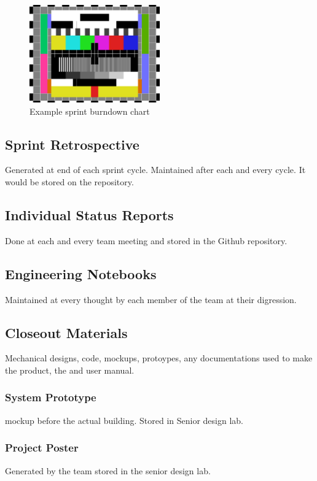 \begin{figure}[h!]
    \centering
    \includegraphics[width=0.5\textwidth]{images/test_image}
    \caption{Example sprint burndown chart}
\end{figure}

\subsection{Sprint Retrospective}
Generated at end of each sprint cycle. Maintained after each and every cycle. It would be stored on the repository.

\subsection{Individual Status Reports}
Done at each and every team meeting and stored in the Github repository.

\subsection{Engineering Notebooks}
Maintained at every thought by each member of the team at their digression.

\subsection{Closeout Materials}
Mechanical designs, code, mockups, protoypes, any documentations used to make the product, the and user manual.

\subsubsection{System Prototype}
mockup before the actual building. Stored in Senior design lab.

\subsubsection{Project Poster}
Generated by the team stored in the senior design lab.

